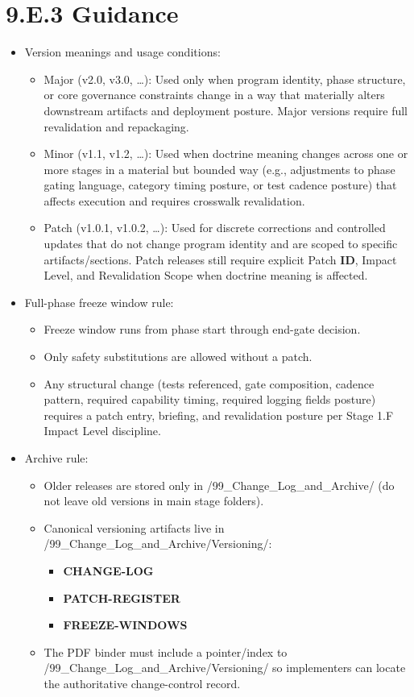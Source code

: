 \documentclass[10pt]{article}
\begin{document}
\endgroup

\section*{9.E.3 Guidance}
{}

\begin{itemize}
\item Version meanings and usage conditions:
  \begin{itemize}
  \item Major (v2.0, v3.0, …): Used only when program identity, phase structure, or core governance constraints change in a way that materially alters downstream artifacts and deployment posture. Major versions require full revalidation and repackaging.
  \item Minor (v1.1, v1.2, …): Used when doctrine meaning changes across one or more stages in a material but bounded way (e.g., adjustments to phase gating language, category timing posture, or test cadence posture) that affects execution and requires crosswalk revalidation.
  \item Patch (v1.0.1, v1.0.2, …): Used for discrete corrections and controlled updates that do not change program identity and are scoped to specific artifacts/sections. Patch releases still require explicit Patch \textbf{ID}, Impact Level, and Revalidation Scope when doctrine meaning is affected.
  \end{itemize}

\item Full-phase freeze window rule:
  \begin{itemize}
  \item Freeze window runs from phase start through end-gate decision.
  \item Only safety substitutions are allowed without a patch.
  \item Any structural change (tests referenced, gate composition, cadence pattern, required capability timing, required logging fields posture) requires a patch entry, briefing, and revalidation posture per Stage 1.F Impact Level discipline.
  \end{itemize}

\item Archive rule:
  \begin{itemize}
  \item Older releases are stored only in /99\_Change\_Log\_and\_Archive/ (do not leave old versions in main stage folders).
  \item Canonical versioning artifacts live in /99\_Change\_Log\_and\_Archive/Versioning/:
    \begin{itemize}
    \item \textbf{CHANGE-LOG}
    \item \textbf{PATCH-REGISTER}
    \item \textbf{FREEZE-WINDOWS}
    \end{itemize}
  \item The PDF binder must include a pointer/index to /99\_Change\_Log\_and\_Archive/Versioning/ so implementers can locate the authoritative change-control record.
  \end{itemize}


\end{itemize}
\end{document}
